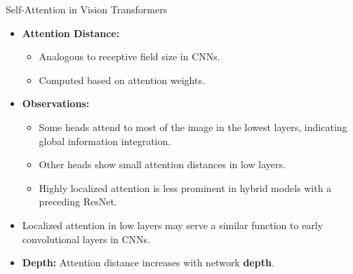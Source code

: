 \begin{frame}{Self-Attention in Vision Transformers}
    \begin{itemize}
        \item \textbf{Attention Distance:} 
        \begin{itemize}
            \item Analogous to receptive field size in CNNs.
            \item Computed based on attention weights.
        \end{itemize}
        \item \textbf{Observations:}
        \begin{itemize}
            \item Some heads attend to most of the image in the lowest layers, indicating global information integration.
            \item Other heads show small attention distances in low layers.
            \item Highly localized attention is less prominent in hybrid models with a preceding ResNet.
        \end{itemize}
        \item Localized attention in low layers may serve a similar function to early convolutional layers in CNNs.
        \item \textbf{Depth:} Attention distance increases with network \textbf{depth}.
    \end{itemize}
\end{frame}